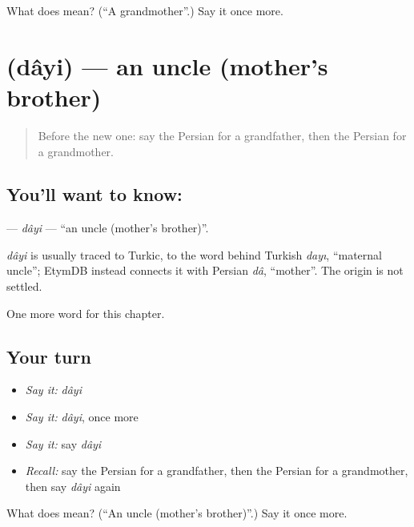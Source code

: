 \begin{tcolorbox}[breakable,colback=teal!4,colframe=teal!35!black,title={Before you move on}]
What does  mean? (\textquotedblleft{}A grandmother\textquotedblright{}.) Say it once more.
\end{tcolorbox}
\section[\texorpdfstring{\fa{دایی} (dâyi)}{دایی (dâyi)}]{ (dâyi) — an uncle (mother's brother)}

\label{lesson:FA-C32-dayi}



\begin{quote}
Before the new one: say the Persian for a grandfather, then the Persian for a grandmother.
\end{quote}

\subsection*{You'll want to know: }
\textbf{} — \emph{dâyi} — \textquotedblleft{}an uncle (mother's brother)\textquotedblright{}.

\begin{cousinweb}
\emph{dâyi} is usually traced to Turkic, to the word behind Turkish \emph{dayı}, \textquotedblleft{}maternal uncle\textquotedblright{}; EtymDB instead connects it with Persian \emph{dâ}, \textquotedblleft{}mother\textquotedblright{}. The origin is not settled.
\end{cousinweb}

\begin{grammarlens}[title={What you've built}]
One more word for this chapter.
\end{grammarlens}

\subsection*{Your turn}
\begin{itemize}
\raggedright
  \item \emph{Say it:} \emph{dâyi}
  \item \emph{Say it:} \emph{dâyi}, once more
  \item \emph{Say it:} say \emph{dâyi}
  \item \emph{Recall:} say the Persian for a grandfather, then the Persian for a grandmother, then say \emph{dâyi} again
\end{itemize}

\begin{tcolorbox}[breakable,colback=teal!4,colframe=teal!35!black,title={Before you move on}]
What does  mean? (\textquotedblleft{}An uncle (mother's brother)\textquotedblright{}.) Say it once more.
\end{tcolorbox}
